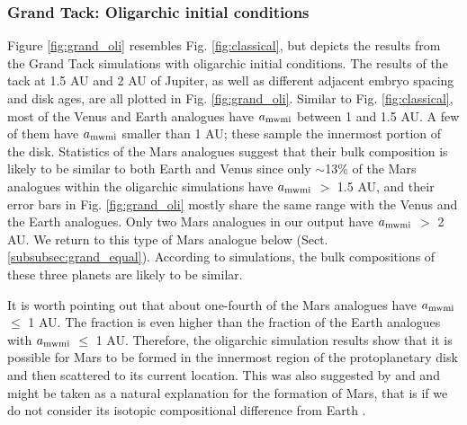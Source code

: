 \documentclass{aa}
\begin{document}
\subsubsection{Grand Tack: Oligarchic initial conditions}
\label{subsubsec:grand_oli}
Figure \ref{fig:grand_oli} resembles Fig. \ref{fig:classical}, but depicts the results from the Grand Tack simulations with oligarchic initial conditions. The results of the tack at 1.5 AU and 2 AU of Jupiter, as well as different adjacent embryo spacing and disk ages, are all plotted in Fig. \ref{fig:grand_oli}. Similar to Fig. \ref{fig:classical}, most of the Venus and Earth analogues have $a_{\rm mwmi}$ between 1 and 1.5 AU. A few of them have $a_{\rm mwmi}$ smaller than 1 AU; these sample the innermost portion of the disk. Statistics of the Mars analogues suggest that their bulk composition is likely to be similar to both Earth and Venus since only $\sim$13\% of the Mars analogues within the oligarchic simulations have $a_{\rm mwmi}$ $>$ 1.5 AU, and their error bars in Fig. \ref{fig:grand_oli} mostly share the same range with the Venus and the Earth analogues. Only two Mars analogues in our output have $a_{\rm mwmi}$ $>$ 2 AU. We return to this type of Mars analogue below (Sect. \ref{subsubsec:grand_equal}). According to simulations, the bulk compositions of these three planets are likely to be similar.

It is worth pointing out that about one-fourth of the Mars analogues have $a_{\rm mwmi}$ $\leq$ 1 AU. The fraction is even higher than the fraction of the Earth analogues with $a_{\rm mwmi}$ $\leq$ 1 AU. Therefore, the oligarchic simulation results show that it is possible for Mars to be formed in the innermost region of the protoplanetary disk and then scattered to its current location. This was also suggested by \cite{hansen2009formation} and \cite{fitoussi2016building} and might be taken as a natural explanation for the formation of Mars, that is if we do not consider its isotopic compositional difference from Earth \citep{brasser2017cool}.

\end{document}
